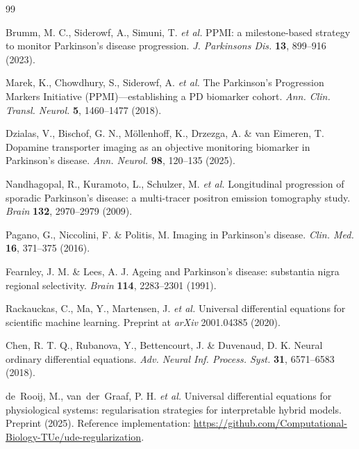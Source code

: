 \begin{thebibliography}{99}

 Brumm, M. C., Siderowf, A., Simuni, T. \textit{et al.} PPMI: a milestone-based strategy to monitor Parkinson's disease progression. \textit{J. Parkinsons Dis.} \textbf{13}, 899--916 (2023).

 Marek, K., Chowdhury, S., Siderowf, A. \textit{et al.} The Parkinson's Progression Markers Initiative (PPMI)---establishing a PD biomarker cohort. \textit{Ann. Clin. Transl. Neurol.} \textbf{5}, 1460--1477 (2018).

 Dzialas, V., Bischof, G. N., M\"ollenhoff, K., Drzezga, A. \& van Eimeren, T. Dopamine transporter imaging as an objective monitoring biomarker in Parkinson's disease. \textit{Ann. Neurol.} \textbf{98}, 120--135 (2025).

 Nandhagopal, R., Kuramoto, L., Schulzer, M. \textit{et al.} Longitudinal progression of sporadic Parkinson's disease: a multi-tracer positron emission tomography study. \textit{Brain} \textbf{132}, 2970--2979 (2009).

 Pagano, G., Niccolini, F. \& Politis, M. Imaging in Parkinson's disease. \textit{Clin. Med.} \textbf{16}, 371--375 (2016).

 Fearnley, J. M. \& Lees, A. J. Ageing and Parkinson's disease: substantia nigra regional selectivity. \textit{Brain} \textbf{114}, 2283--2301 (1991).

 Rackauckas, C., Ma, Y., Martensen, J. \textit{et al.} Universal differential equations for scientific machine learning. Preprint at \textit{arXiv} 2001.04385 (2020).

 Chen, R. T. Q., Rubanova, Y., Bettencourt, J. \& Duvenaud, D. K. Neural ordinary differential equations. \textit{Adv. Neural Inf. Process. Syst.} \textbf{31}, 6571--6583 (2018).

 de~Rooij, M., van~der~Graaf, P. H. \textit{et al.} Universal differential equations for physiological systems: regularisation strategies for interpretable hybrid models. Preprint (2025). Reference implementation: \url{https://github.com/Computational-Biology-TUe/ude-regularization}.


\end{thebibliography}

